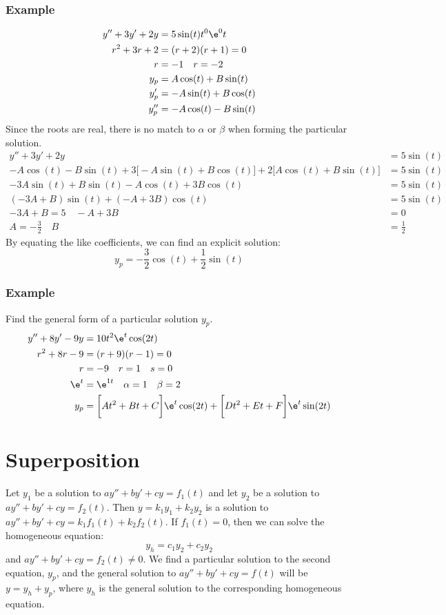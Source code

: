 \documentclass{math}
\begin{document}
\subsubsection*{Example}
\begin{align*}
  y''+3y'+2y &= 5\sin(t)t^0\e^0t \\
  r^2+3r+2 &= (r+2)(r+1) = 0 \\
  r &= -1 \quad r = -2 \\
  y_p &= A\cos(t)+B\sin(t) \\
  y_p' &= -A\sin(t)+B\cos(t) \\
  y_p'' &= -A\cos(t)-B\sin(t)
\end{align*}
Since the roots are real, there is no match to \( \alpha \) or \( \beta \) when
forming the particular solution.
\begin{align*}
  y''+3y'+2y &= 5\sin(t) \\
  -A\cos(t)-B\sin(t)+3\bigg[-A\sin(t)+B\cos(t)\bigg]+
    2\bigg[A\cos(t)+B\sin(t)\bigg] &= 5\sin(t) \\
  -3A\sin(t)+B\sin(t)-A\cos(t)+3B\cos(t) &= 5\sin(t) \\
  (-3A+B)\sin(t)+(-A+3B)\cos(t) &= 5\sin(t) \\
  -3A+B = 5 \quad -A+3B &= 0 \\
  A = -\frac{3}{2} \quad B &= \frac{1}{2}
\end{align*}
By equating the like coefficients, we can find an explicit solution:
\[ y_p = -\frac{3}{2}\cos(t)+\frac{1}{2}\sin(t) \]

\subsubsection*{Example}
Find the general form of a particular solution \( y_p \).
\begin{align*}
  y''+8y'-9y &= 10t^2\e^t\cos(2t) \\
  r^2+8r-9 &= (r+9)(r-1) = 0 \\
  r &= -9 \quad r = 1 \quad s = 0 \\
  \e^t &= \e^{1t} \quad \alpha = 1 \quad \beta = 2 \\
  y_p &= \bigg[At^2+Bt+C\bigg]\e^t\cos(2t)+\bigg[Dt^2+Et+F\bigg]\e^t\sin(2t)
\end{align*}

\clearpage
\section*{Superposition}
Let \( y_1 \) be a solution to \( ay''+by'+cy = f_1(t) \) and let \( y_2 \) be
a solution to \( ay''+by'+cy = f_2(t) \). Then \( y = k_1y_1+k_2y_2 \) is a
solution to \( ay''+by'+cy = k_1f_1(t)+k_2f_2(t) \). If \( f_1(t) = 0 \), then
we can solve the homogeneous equation:
\[ y_h = c_1y_2+c_2y_2 \]
and \( ay''+by'+cy = f_2(t) \ne 0 \). We find a particular solution to the
second equation, \( y_p \), and the general solution to \( ay''+by'+cy = f(t) \)
will be \( y = y_h+y_p \), where \( y_h \) is the general solution to the
corresponding homogeneous equation.
\end{document}
